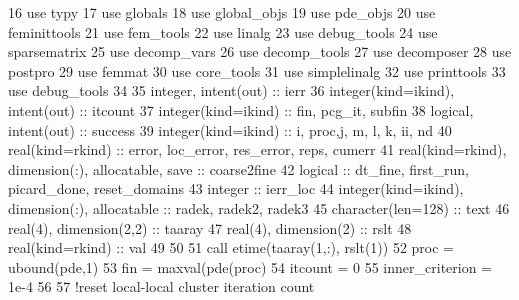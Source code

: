 \begin{DoxyCode}
16         \textcolor{keywordtype}{use }typy
17         \textcolor{keywordtype}{use }globals
18         \textcolor{keywordtype}{use }global_objs
19         \textcolor{keywordtype}{use }pde_objs
20         \textcolor{keywordtype}{use }feminittools
21         \textcolor{keywordtype}{use }fem_tools
22         \textcolor{keywordtype}{use }linalg
23         \textcolor{keywordtype}{use }debug_tools
24         \textcolor{keywordtype}{use }sparsematrix
25         \textcolor{keywordtype}{use }decomp_vars
26         \textcolor{keywordtype}{use }decomp_tools
27         \textcolor{keywordtype}{use }decomposer
28         \textcolor{keywordtype}{use }postpro
29         \textcolor{keywordtype}{use }femmat
30         \textcolor{keywordtype}{use }core_tools
31         \textcolor{keywordtype}{use }simplelinalg
32         \textcolor{keywordtype}{use }printtools
33         \textcolor{keywordtype}{use }debug_tools
34 
35         \textcolor{keywordtype}{integer}, \textcolor{keywordtype}{intent(out)} :: ierr
36         \textcolor{keywordtype}{integer(kind=ikind)}, \textcolor{keywordtype}{intent(out)} :: itcount
37         \textcolor{keywordtype}{integer(kind=ikind)} ::  fin, pcg\_it, subfin
38         \textcolor{keywordtype}{logical}, \textcolor{keywordtype}{intent(out)} :: success
39         \textcolor{keywordtype}{integer(kind=ikind)} :: i, proc,j, m, l, k, ii, nd
40         \textcolor{keywordtype}{real(kind=rkind)} :: error, loc\_error, res\_error, reps, cumerr
41         \textcolor{keywordtype}{real(kind=rkind)}, \textcolor{keywordtype}{dimension(:)}, \textcolor{keywordtype}{allocatable}, \textcolor{keywordtype}{save} :: coarse2fine
42         \textcolor{keywordtype}{logical} :: dt\_fine, first\_run, picard\_done, reset\_domains
43         \textcolor{keywordtype}{integer} :: ierr\_loc
44         \textcolor{keywordtype}{integer(kind=ikind)}, \textcolor{keywordtype}{dimension(:)}, \textcolor{keywordtype}{allocatable} :: radek, radek2, radek3
45         \textcolor{keywordtype}{character(len=128)} :: text
46         \textcolor{keywordtype}{real(4)}, \textcolor{keywordtype}{dimension(2,2)} :: taaray
47         \textcolor{keywordtype}{real(4)}, \textcolor{keywordtype}{dimension(2)} :: rslt
48         \textcolor{keywordtype}{real(kind=rkind)} :: val
49 
50 
51         \textcolor{keyword}{call }etime(taaray(1,:), rslt(1))
52         proc = ubound(pde,1)
53         fin = maxval(pde(proc)%
54         itcount = 0
55         inner_criterion = 1e-4
56 
57         \textcolor{comment}{!reset local-local cluster iteration count}

\end{DoxyCode}
